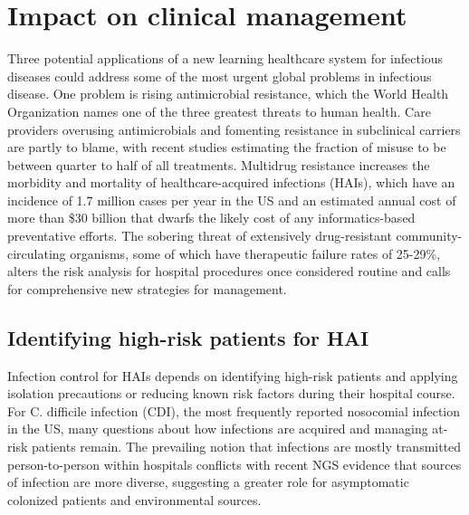 \section{Impact on clinical management}

Three potential applications of a new learning healthcare system for infectious diseases could address some of the most urgent global problems in infectious disease. One problem is rising antimicrobial resistance, which the World Health Organization names one of the three greatest threats to human health.\autocite{Policy2010} Care providers overusing antimicrobials and fomenting resistance in subclinical carriers are partly to blame, with recent studies estimating the fraction of misuse to be between quarter to half of all treatments.\autocite{McKellar2014} Multidrug resistance increases the morbidity and mortality of healthcare-acquired infections (HAIs), which have an incidence of 1.7 million cases per year in the US and an estimated annual cost of more than \$30 billion \autocite{Scott2009} that dwarfs the likely cost of any informatics-based preventative efforts. The sobering threat of extensively drug-resistant community-circulating organisms, some of which have therapeutic failure rates of 25-29\%,\autocite{Hirsch2010} alters the risk analysis for hospital procedures once considered routine and calls for comprehensive new strategies for management.

\subsection{Identifying high-risk patients for HAI}

Infection control for HAIs depends on identifying high-risk patients and applying isolation precautions or reducing known risk factors during their hospital course. For C. difficile infection (CDI), the most frequently reported nosocomial infection in the US, many questions about how infections are acquired and managing at-risk patients remain.\autocite{Leffler2015} The prevailing notion that infections are mostly transmitted person-to-person within hospitals \autocite{Cohen2010} conflicts with recent NGS evidence that sources of infection are more diverse,\autocite{Eyre2013} suggesting a greater role for asymptomatic colonized patients and environmental sources.

